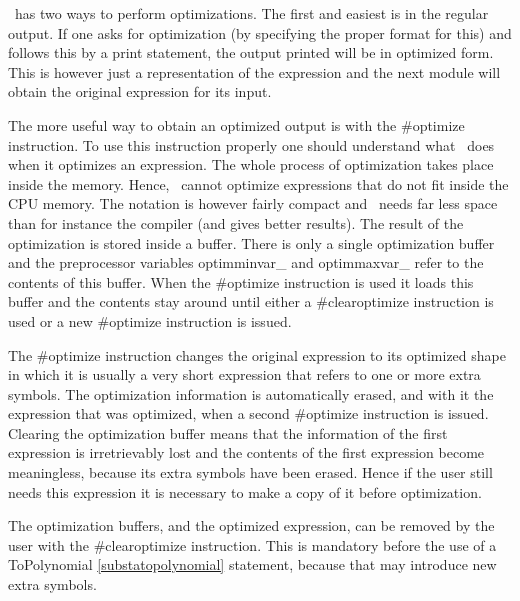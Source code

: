 \FORM\ has two ways to perform optimizations. The first and easiest is in 
the regular output. If one asks for optimization (by specifying the proper 
format for this) and follows this by a print statement, the output printed 
will be in optimized form. This is however just a representation of the 
expression and the next module will obtain the original expression for its 
input.

The more useful way to obtain an optimized output is with the \#optimize 
instruction. To use this instruction properly one should understand what 
\FORM\ does when it optimizes an expression. The whole process of 
optimization takes place inside the memory. Hence, \FORM\ cannot optimize 
expressions that do not fit inside the CPU memory. The notation is however 
fairly compact and \FORM\ needs far less space than for instance the 
compiler (and gives better results). The result of the optimization is 
stored inside a buffer. There is only a single optimization 
buffer and the preprocessor variables 
optimminvar\_ and optimmaxvar\_ 
refer to the contents of this buffer. When the \#optimize instruction is 
used it loads this buffer and the contents stay around until either a 
\#clearoptimize instruction is used or a new \#optimize instruction is 
issued.

The \#optimize instruction changes the original expression to its optimized 
shape in which it is usually a very short expression that refers to one or 
more extra symbols. The optimization information is automatically erased, 
and with it the expression that was optimized, when a second \#optimize 
instruction is issued. Clearing the optimization buffer means that the 
information of the first expression is irretrievably lost and the contents 
of the first expression become meaningless, because its extra symbols have 
been erased. Hence if the user still needs this expression it is necessary 
to make a copy of it before optimization.

The optimization buffers, and the optimized expression, can be removed by 
the user with the \#clearoptimize instruction. This is mandatory before the 
use of a ToPolynomial \ref{substatopolynomial} 
statement, because that may introduce new extra symbols.

